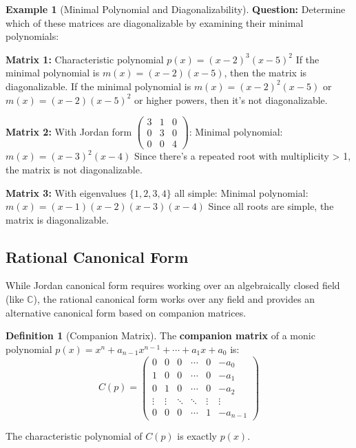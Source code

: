 \documentclass[12pt]{article}
\numberwithin{equation}{section}
\theoremstyle{plain}
\theoremstyle{definition}
\newtheorem{definition}[theorem]{Definition}
\newtheorem{example}[theorem]{Example}
\theoremstyle{remark}
\begin{document}
\begin{example}[Minimal Polynomial and Diagonalizability]
\textbf{Question:} Determine which of these matrices are diagonalizable by examining their minimal polynomials:

\textbf{Matrix 1:} Characteristic polynomial $p(x) = (x - 2)^3(x - 5)^2$
If the minimal polynomial is $m(x) = (x - 2)(x - 5)$, then the matrix is diagonalizable.
If the minimal polynomial is $m(x) = (x - 2)^2(x - 5)$ or $m(x) = (x - 2)(x - 5)^2$ or higher powers, then it's not diagonalizable.

\textbf{Matrix 2:} With Jordan form $\begin{pmatrix} 3 & 1 & 0 \\ 0 & 3 & 0 \\ 0 & 0 & 4 \end{pmatrix}$:
Minimal polynomial: $m(x) = (x - 3)^2(x - 4)$
Since there's a repeated root with multiplicity > 1, the matrix is not diagonalizable.

\textbf{Matrix 3:} With eigenvalues $\{1, 2, 3, 4\}$ all simple:
Minimal polynomial: $m(x) = (x - 1)(x - 2)(x - 3)(x - 4)$
Since all roots are simple, the matrix is diagonalizable.
\end{example}

\subsection{Rational Canonical Form}

While Jordan canonical form requires working over an algebraically closed field (like $\mathbb{C}$), the rational canonical form works over any field and provides an alternative canonical form based on companion matrices.

\begin{definition}[Companion Matrix]
The \textbf{companion matrix} of a monic polynomial $p(x) = x^n + a_{n-1}x^{n-1} + \cdots + a_1x + a_0$ is:
$$C(p) = \begin{pmatrix}
0 & 0 & 0 & \cdots & 0 & -a_0 \\
1 & 0 & 0 & \cdots & 0 & -a_1 \\
0 & 1 & 0 & \cdots & 0 & -a_2 \\
\vdots & \vdots & \ddots & \ddots & \vdots & \vdots \\
0 & 0 & 0 & \cdots & 1 & -a_{n-1}
\end{pmatrix}$$

The characteristic polynomial of $C(p)$ is exactly $p(x)$.
\end{definition}
\end{document}
